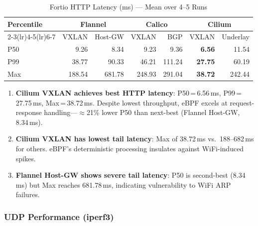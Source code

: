 \documentclass[11pt,a4paper]{article}
\begin{document}
\begin{table}[H]
\centering
\caption{Fortio HTTP Latency (ms) --- Mean over 4--5 Runs}
\begin{tabular}{lrrrrrr}
  \toprule
  \multirow{2}{*}{\textbf{Percentile}} & \multicolumn{2}{c}{\textbf{Flannel}} & \multicolumn{2}{c}{\textbf{Calico}} & \multicolumn{2}{c}{\textbf{Cilium}} \\
  \cmidrule(lr){2-3}\cmidrule(lr){4-5}\cmidrule(lr){6-7}
  & VXLAN & Host-GW & VXLAN & BGP & VXLAN & Underlay \\
  \midrule
  P50  & 9.26 & 8.34 & 9.23 & 9.36 & \textbf{6.56} & 11.54 \\
  P99  & 38.77 & 90.33 & 46.21 & 111.24 & \textbf{27.75} & 60.19 \\
  Max  & 188.54 & 681.78 & 248.93 & 291.04 & \textbf{38.72} & 242.44 \\
  \bottomrule
\end{tabular}
\label{tab:bm-fortio}
\end{table}

\begin{findingbox}
\begin{enumerate}
  \item \textbf{Cilium VXLAN achieves best HTTP latency}: P50\,=\,6.56\,ms, P99\,=\,27.75\,ms, Max\,=\,38.72\,ms. Despite lowest throughput, eBPF excels at request-response handling---$\approx$21\% lower P50 than next-best (Flannel Host-GW, 8.34\,ms).
  \item \textbf{Cilium VXLAN has lowest tail latency}: Max of 38.72\,ms vs.\ 188--682\,ms for others. eBPF's deterministic processing insulates against WiFi-induced spikes.
  \item \textbf{Flannel Host-GW shows severe tail latency}: P50 is second-best (8.34\,ms) but Max reaches 681.78\,ms, indicating vulnerability to WiFi ARP failures.
\end{enumerate}
\end{findingbox}

\subsubsection{UDP Performance (iperf3)}
\end{document}
